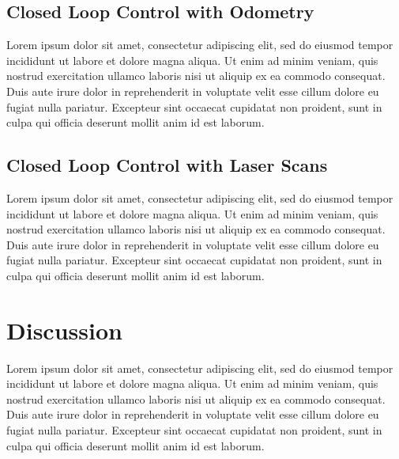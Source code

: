 \documentclass[conference]{IEEEtran}
\begin{document}
\subsection{Closed Loop Control with Odometry}
Lorem ipsum dolor sit amet, consectetur adipiscing elit, sed do eiusmod tempor incididunt ut labore et dolore magna aliqua. Ut enim ad minim veniam, quis nostrud exercitation ullamco laboris nisi ut aliquip ex ea commodo consequat. Duis aute irure dolor in reprehenderit in voluptate velit esse cillum dolore eu fugiat nulla pariatur. Excepteur sint occaecat cupidatat non proident, sunt in culpa qui officia deserunt mollit anim id est laborum.

\subsection{Closed Loop Control with Laser Scans}
Lorem ipsum dolor sit amet, consectetur adipiscing elit, sed do eiusmod tempor incididunt ut labore et dolore magna aliqua. Ut enim ad minim veniam, quis nostrud exercitation ullamco laboris nisi ut aliquip ex ea commodo consequat. Duis aute irure dolor in reprehenderit in voluptate velit esse cillum dolore eu fugiat nulla pariatur. Excepteur sint occaecat cupidatat non proident, sunt in culpa qui officia deserunt mollit anim id est laborum.

\section{Discussion}
 Lorem ipsum dolor sit amet, consectetur adipiscing elit, sed do eiusmod tempor incididunt ut labore et dolore magna aliqua. Ut enim ad minim veniam, quis nostrud exercitation ullamco laboris nisi ut aliquip ex ea commodo consequat. Duis aute irure dolor in reprehenderit in voluptate velit esse cillum dolore eu fugiat nulla pariatur. Excepteur sint occaecat cupidatat non proident, sunt in culpa qui officia deserunt mollit anim id est laborum.

%
%



\clearpage
\begin{appendices}
\onecolumn
\end{appendices}
\end{document}
